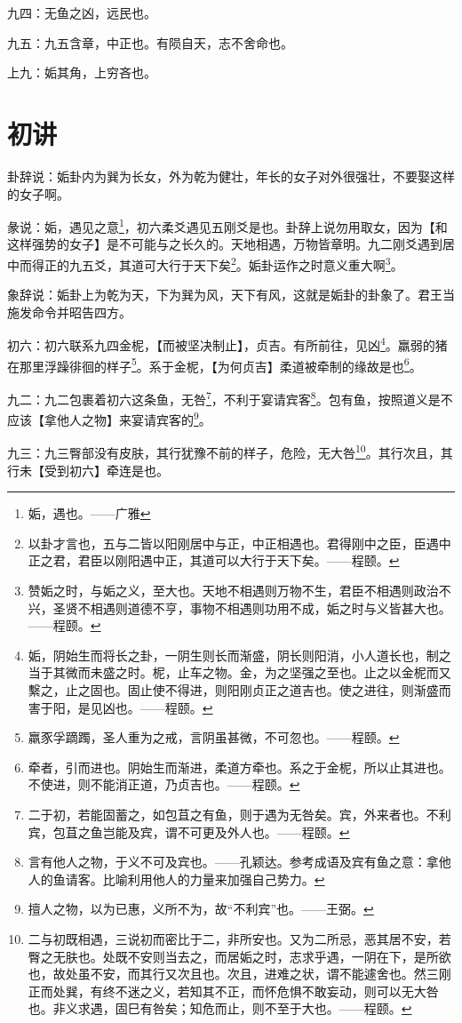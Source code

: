 \documentclass[12pt,oneside]{book}
\begin{document}
九四：无鱼之凶，远民也。

九五：九五含章，中正也。有陨自天，志不舍命也。

上九：姤其角，上穷吝也。


\section{初讲}
卦辞说：姤卦内为巽为长女，外为乾为健壮，年长的女子对外很强壮，不要娶这样的女子啊。

彖说：姤，遇见之意\footnote{姤，遇也。——广雅}，初六柔爻遇见五刚爻是也。卦辞上说勿用取女，因为【和这样强势的女子】是不可能与之长久的。天地相遇，万物皆章明。九二刚爻遇到居中而得正的九五爻，其道可大行于天下矣\footnote{以卦才言也，五与二皆以阳刚居中与正，中正相遇也。君得刚中之臣，臣遇中正之君，君臣以刚阳遇中正，其道可以大行于天下矣。——程颐。}。姤卦运作之时意义重大啊\footnote{赞姤之时，与姤之义，至大也。天地不相遇则万物不生，君臣不相遇则政治不兴，圣贤不相遇则道德不亨，事物不相遇则功用不成，姤之时与义皆甚大也。——程颐。}。

象辞说：姤卦上为乾为天，下为巽为风，天下有风，这就是姤卦的卦象了。君王当施发命令并昭告四方。

初六：初六联系九四金柅，【而被坚决制止】，贞吉。有所前往，见凶\footnote{姤，阴始生而将长之卦，一阴生则长而渐盛，阴长则阳消，小人道长也，制之当于其微而未盛之时。柅，止车之物。金，为之坚强之至也。止之以金柅而又繫之，止之固也。固止使不得进，则阳刚贞正之道吉也。使之进往，则渐盛而害于阳，是见凶也。——程颐。}。羸弱的猪在那里浮躁徘徊的样子\footnote{羸豕孚蹢躅，圣人重为之戒，言阴虽甚微，不可忽也。——程颐。}。系于金柅，【为何贞吉】柔道被牵制的缘故是也\footnote{牵者，引而进也。阴始生而渐进，柔道方牵也。系之于金柅，所以止其进也。不使进，则不能消正道，乃贞吉也。——程颐。}。

九二：九二包裹着初六这条鱼，无咎\footnote{二于初，若能固蓄之，如包苴之有鱼，则于遇为无咎矣。宾，外来者也。不利宾，包苴之鱼岂能及宾，谓不可更及外人也。——程颐。}，不利于宴请宾客\footnote{言有他人之物，于义不可及宾也。——孔颖达。参考成语及宾有鱼之意：拿他人的鱼请客。比喻利用他人的力量来加强自己势力。}。包有鱼，按照道义是不应该【拿他人之物】来宴请宾客的\footnote{擅人之物，以为已惠，义所不为，故“不利宾”也。——王弼。}。

九三：九三臀部没有皮肤，其行犹豫不前的样子，危险，无大咎\footnote{二与初既相遇，三说初而密比于二，非所安也。又为二所忌，恶其居不安，若臀之无肤也。处既不安则当去之，而居姤之时，志求乎遇，一阴在下，是所欲也，故处虽不安，而其行又次且也。次且，进难之状，谓不能遽舍也。然三刚正而处巽，有终不迷之义，若知其不正，而怀危惧不敢妄动，则可以无大咎也。非义求遇，固巳有咎矣；知危而止，则不至于大也。——程颐。}。其行次且，其行未【受到初六】牵连是也。
\end{document}
